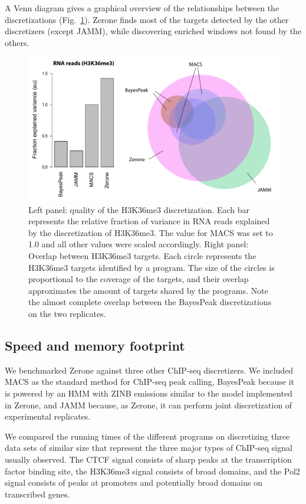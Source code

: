 \documentclass{bioinfo}
\begin{document}
A Venn diagram gives a graphical overview of the relationships
between the discretizations (Fig.~\ref{fig:venn}). Zerone finds
most of the targets detected by the other discretizers (except JAMM),
while discovering enriched windows not found by the others.

\begin{figure}[!tpb]
\centerline{\includegraphics[scale=0.4]{histone_venn_color_names.pdf}}
\caption{
  Left panel: quality of the H3K36me3 discretization. Each bar
  represents the relative fraction of variance in RNA reads
  explained by the discretization of H3K36me3. The value for MACS was
  set to 1.0 and all other values were scaled accordingly. Right
  panel: Overlap between H3K36me3 targets. Each circle represents the
  H3K36me3 targets identified by a program. The size of the circles
  is proportional to the coverage of the targets, and their overlap
  approximates the amount of targets shared by the programs. Note
  the almost complete overlap between the BayesPeak discretizations
  on the two replicates.
}\label{fig:venn}
\end{figure}

\subsection{Speed and memory footprint}
We benchmarked Zerone against three other ChIP-seq discretizers.
We included MACS as the standard method for ChIP-seq peak calling,
BayesPeak because it is powered by an HMM with ZINB emissions
similar to the model implemented in Zerone, and JAMM because, as
Zerone, it can perform joint discretization of experimental replicates.

We compared the running times of the different programs on discretizing
three data sets of similar size that represent the three major types of
ChIP-seq signal usually observed. The CTCF signal consists of sharp
peaks at the transcription factor binding site, the H3K36me3 signal
consists of broad domains, and the Pol2 signal consists of  peaks
at promoters and potentially broad domains on transcribed genes.
\end{document}
